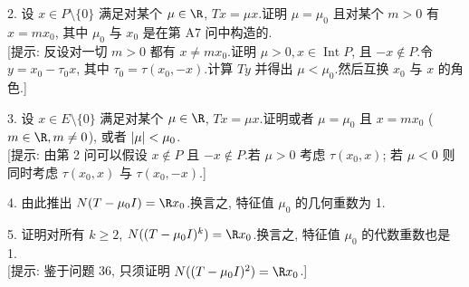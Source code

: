 \begin{problem}[第 1, 6 章]
2. 设 $x\in P\setminus\{0\}$ 满足对某个 $\mu\in\R$, $Tx=\mu x$.证明 $\mu=\mu_0$
且对某个 $m>0$ 有 $x=mx_0$, 其中 $\mu_0$ 与 $x_0$ 是在第 A7 问中构造的.\\
{[提示: 反设对一切 $m>0$ 都有 $x\ne mx_0$.证明 $\mu>0,x\in\operatorname{Int}P$,
且 $-x\notin P$.令 $y=x_0-\tau_0x$, 其中 $\tau_0=\tau(x_0,-x)$.计算 $Ty$ 并得出
$\mu<\mu_0$.然后互换 $x_0$ 与 $x$ 的角色.]}

3. 设 $x\in E\setminus\{0\}$ 满足对某个 $\mu\in\R$, $Tx=\mu x$.证明或者 $\mu=\mu_0$
且 $x=mx_0$ ($m\in\R,m\ne0$), 或者 $\left|\mu\right|<\mu_0$.\\
{[提示: 由第 2 问可以假设 $x\notin P$ 且 $-x\notin P$.若 $\mu>0$ 考虑 $\tau(x_0,x)$;
若 $\mu<0$ 则同时考虑 $\tau(x_0,x)$ 与 $\tau(x_0,-x)$.]}

4. 由此推出 $N(T-\mu_0I)=\R x_0$.换言之, 特征值 $\mu_0$ 的几何重数为 1.

5. 证明对所有 $k\ge2$, $N((T-\mu_0I)^k)=\R x_0$.换言之, 特征值 $\mu_0$ 的代数重数也是 1.\\
{[提示: 鉴于问题 36, 只须证明 $N((T-\mu_0I)^2)=\R x_0$.]}
\end{problem}

